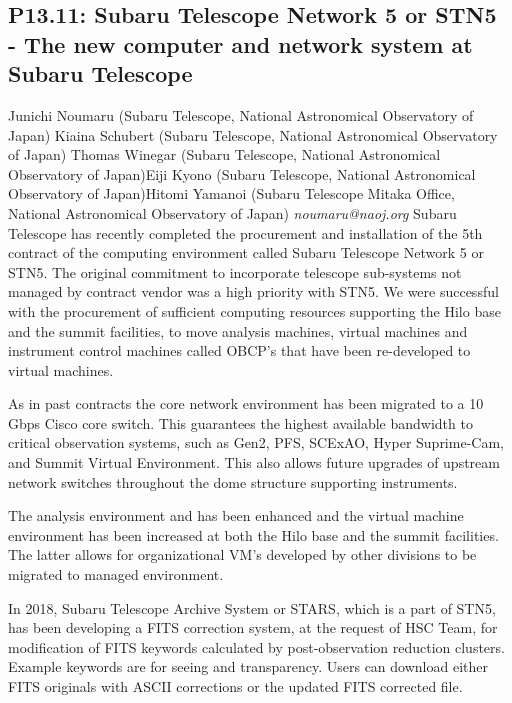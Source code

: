 \documentclass{report}
\begin{document}
\subsection*{P13.11: Subaru Telescope Network 5 or STN5 - The new computer and network system at Subaru Telescope}
\bigskip
Junichi Noumaru (Subaru Telescope, National Astronomical Observatory of Japan) \newline Kiaina Schubert (Subaru Telescope, National Astronomical Observatory of Japan) \newline  Thomas Winegar (Subaru Telescope, National Astronomical Observatory of Japan)\newline  Eiji Kyono (Subaru Telescope, National Astronomical Observatory of Japan)\newline Hitomi Yamanoi (Subaru Telescope Mitaka Office, National Astronomical Observatory of Japan)\newline  \newline\newline
{\it noumaru@naoj.org}\newline
\newline\newline
Subaru Telescope has recently completed the procurement and installation of the 5th contract of the computing environment called Subaru Telescope Network 5 or STN5.  The original commitment to incorporate telescope sub-systems not managed by contract vendor was a high priority with STN5. We were successful with the procurement of sufficient computing resources supporting the Hilo base and the summit facilities, to move analysis machines, virtual machines and instrument control machines called OBCP’s that have been re-developed to virtual machines.  

As in past contracts the core network environment has been migrated to a 10 Gbps Cisco core switch. This guarantees the highest available bandwidth to critical observation systems, such as Gen2, PFS, SCExAO, Hyper Suprime-Cam, and Summit Virtual Environment. This also allows future upgrades of upstream network switches throughout the dome structure supporting instruments.  

The analysis environment and has been enhanced and the virtual machine environment has been increased at both the Hilo base and the summit facilities. The latter allows for organizational VM’s developed by other divisions to be migrated to managed environment.

In 2018, Subaru Telescope Archive System or STARS, which is a part of STN5, has been developing a FITS correction system, at the request of HSC Team, for modification of FITS keywords calculated by post-observation reduction clusters. Example keywords are for seeing and transparency.  Users can download either FITS originals with ASCII corrections or the updated FITS corrected file.
\end{document}
